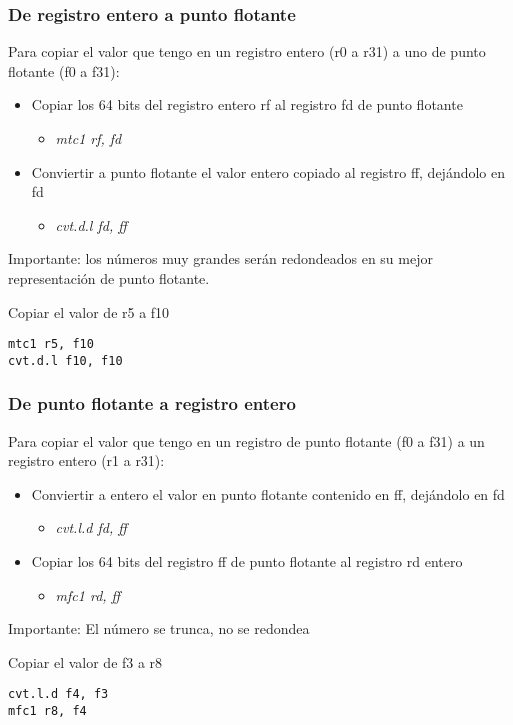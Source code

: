 \documentclass{beamer}
\begin{document}
\begin{frame}[fragile]
\frametitle{De registro entero a punto flotante}
Para copiar el valor que tengo en un registro entero (r0 a r31) a uno de punto flotante (f0 a f31):
\begin{itemize}
\item Copiar los 64 bits del registro entero rf al registro fd de punto flotante
\begin{itemize}
\item \emph{mtc1 rf, fd}
\end{itemize}

\item Conviertir a punto flotante el valor entero copiado al registro ff, dejándolo en fd
\begin{itemize}
\item \emph{cvt.d.l fd, ff}
\end{itemize}

\end{itemize}

Importante: los números muy grandes serán redondeados en su mejor representación de punto flotante.

\begin{block}{Copiar el valor de r5 a f10}
\begin{lstlisting}[language=WinMIPS64,basicstyle=\ttfamily,keywordstyle=\color{blue}]
mtc1 r5, f10
cvt.d.l f10, f10
\end{lstlisting}
\end{block}

\end{frame}

\begin{frame}[fragile]
\frametitle{De punto flotante a registro entero}
Para copiar el valor que tengo en un registro de punto flotante (f0 a f31) a un registro entero (r1 a r31):
\begin{itemize}
\item Conviertir a entero el valor en punto flotante contenido en ff, dejándolo en fd
\begin{itemize}
\item \emph{cvt.l.d fd, ff}
\end{itemize}
\item Copiar los 64 bits del registro ff de punto flotante al registro rd entero
\begin{itemize}
\item \emph{mfc1 rd, ff}
\end{itemize}
\end{itemize}

Importante: El número se trunca, no se redondea
\begin{block}{Copiar el valor de f3 a r8}
\begin{lstlisting}[language=WinMIPS64,basicstyle=\ttfamily,keywordstyle=\color{blue}]
cvt.l.d f4, f3
mfc1 r8, f4
\end{lstlisting}
\end{block}

\end{frame}
\end{document}
